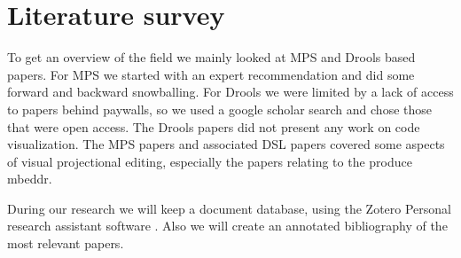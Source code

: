 \section{Literature survey}

To get an overview of the field we mainly looked at MPS and Drools based papers.  
For MPS we started with an expert recommendation and did some forward and backward snowballing.
For Drools we were limited by a lack of access to papers behind paywalls, so we used a google scholar search and chose those that were open access.
The Drools papers did not present any work on code visualization. 
The MPS papers and associated DSL papers covered some aspects of visual projectional editing, especially the papers relating to the produce mbeddr.

During our research we will keep a document database, using the Zotero Personal research assistant software \cite{Zotero_product_page}.
Also we will create an annotated bibliography of the most relevant papers.


